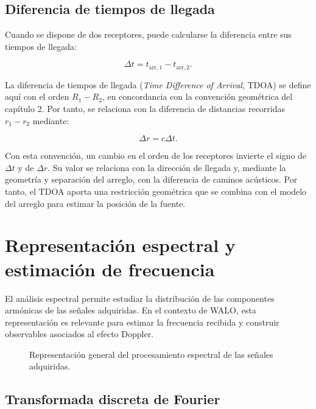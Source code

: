 \subsection*{Diferencia de tiempos de llegada}

Cuando se dispone de dos receptores, puede calcularse la diferencia
entre sus tiempos de llegada:

\begin{equation}
    \Delta t
    =
    t_{\mathrm{arr},1}
    -
    t_{\mathrm{arr},2}.
    \label{eq:delta_t_toa}
\end{equation}

La diferencia de tiempos de llegada (\textit{Time Difference of Arrival},
TDOA) se define aquí con el orden $R_1-R_2$, en concordancia con la
convención geométrica del capítulo 2. Por tanto, se relaciona con la
diferencia de distancias recorridas $r_1-r_2$ mediante:

\begin{equation}
    \Delta r
    =
    c\Delta t.
    \label{eq:delta_r_tdoa}
\end{equation}

Con esta convención, un cambio en el orden de los receptores invierte
el signo de $\Delta t$ y de $\Delta r$. Su valor se relaciona con la
dirección de llegada y, mediante la geometría y separación del arreglo,
con la diferencia de caminos acústicos. Por tanto, el TDOA aporta una
restricción geométrica que
se combina con el modelo del arreglo para estimar la posición de
la fuente.



\section{Representación espectral y estimación de frecuencia}

El análisis espectral permite estudiar la distribución de las componentes
armónicas de las señales adquiridas. En el contexto de WALO, esta
representación es relevante para estimar la frecuencia recibida y
construir observables asociados al efecto Doppler.

\begin{figure}[htbp]
    \centering
    
    \vspace{0.3cm}
    \caption{Representación general del procesamiento espectral de las
    señales adquiridas.}
    \label{fig:rama_b_flujo}
\end{figure}

\subsection*{Transformada discreta de Fourier}

